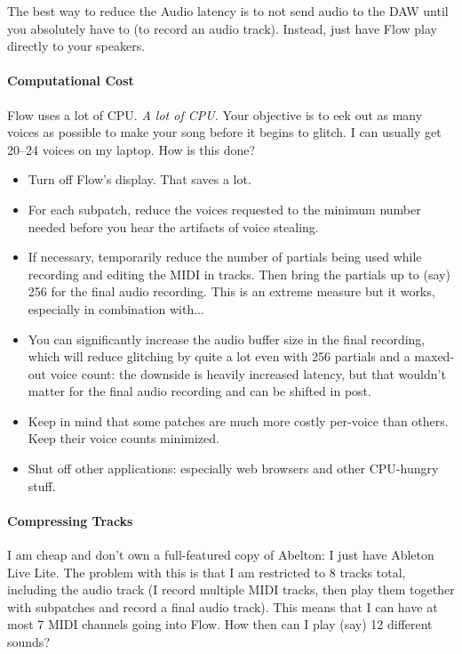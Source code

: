 \documentclass{article}
\begin{document}
The best way to reduce the Audio latency is to not send audio to the DAW until you absolutely have to (to record an audio track).  Instead, just have Flow play directly to your speakers.

\paragraph{Computational Cost} Flow uses a lot of CPU.   {\it A lot of CPU.}   Your objective is to eek out as many voices as possible to make your song before it begins to glitch.  I can usually get 20--24 voices on my laptop.  How is this done?

\begin{itemize}
\item Turn off Flow's display.  That saves a lot.
\item For each subpatch, reduce the voices requested to the minimum number needed before you hear the artifacts of voice stealing. 
\item If necessary, temporarily reduce the number of partials being used while recording and editing the MIDI in tracks.  Then bring the partials up to (say) 256 for the final audio recording.  This is an extreme measure but it works, especially in combination with...
\item You can significantly increase the audio buffer size in the final recording, which will reduce glitching by quite a lot even with 256 partials and a maxed-out voice count: the downside is heavily increased latency, but that wouldn't matter for the final audio recording and can be shifted in post.
\item Keep in mind that some patches are much more costly per-voice than others.  Keep their voice counts minimized.
\item Shut off other applications: especially web browsers and other CPU-hungry stuff.
\end{itemize}

\paragraph{Compressing Tracks} I am cheap and don't own a full-featured copy of Abelton: I just have Ableton Live Lite.  The problem with this is that I am restricted to 8 tracks total, including the audio track (I record multiple MIDI tracks, then play them together with subpatches and record a final audio track).  This means that I can have at most 7 MIDI channels going into Flow.  How then can I play (say) 12 different sounds?
\end{document}

